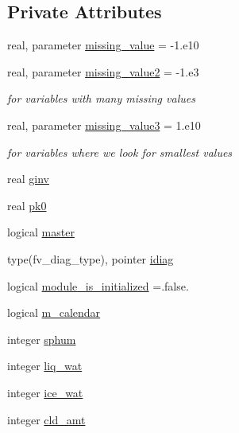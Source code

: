 \subsection*{Private Attributes}
\begin{DoxyCompactItemize}
\item 
real, parameter \hyperlink{classfv__diagnostics__mod_a85945ffd2684b529ef36fb377f2780df}{missing\-\_\-value} = -\/1.e10
\item 
real, parameter \hyperlink{classfv__diagnostics__mod_a0c2b1829b03a7fb093b3d4166de5394a}{missing\-\_\-value2} = -\/1.e3
\begin{DoxyCompactList}\small\item\em for variables with many missing values \end{DoxyCompactList}\item 
real, parameter \hyperlink{classfv__diagnostics__mod_a8751fd73bba3e1f6cd852633004b7753}{missing\-\_\-value3} = 1.e10
\begin{DoxyCompactList}\small\item\em for variables where we look for smallest values \end{DoxyCompactList}\item 
real \hyperlink{classfv__diagnostics__mod_af69e1742e47bc565a4a6e3a436ccb3ea}{ginv}
\item 
real \hyperlink{classfv__diagnostics__mod_a8c1566f74237104b24c6a20268168281}{pk0}
\item 
logical \hyperlink{classfv__diagnostics__mod_a279b4f0374bf7714fae5b351ce11f023}{master}
\item 
type(fv\-\_\-diag\-\_\-type), pointer \hyperlink{classfv__diagnostics__mod_ac17b875d8dec772373a51852c40f0a8a}{idiag}
\item 
logical \hyperlink{classfv__diagnostics__mod_a3f48dc8f540ea0ac0363168cffaf752c}{module\-\_\-is\-\_\-initialized} =.false.
\item 
logical \hyperlink{classfv__diagnostics__mod_a960ab9b28f836a3d409385b29ca55c01}{m\-\_\-calendar}
\item 
integer \hyperlink{classfv__diagnostics__mod_a60dad9285aa4277546ef49434b1d9362}{sphum}
\item 
integer \hyperlink{classfv__diagnostics__mod_a338a3f41be9414e9ec7ab618e5c451f7}{liq\-\_\-wat}
\item 
integer \hyperlink{classfv__diagnostics__mod_af189fa9869405f3888a1f2134dd03f3f}{ice\-\_\-wat}
\item 
integer \hyperlink{classfv__diagnostics__mod_a1e2dc795feb615f8ea7829bdb04319ea}{cld\-\_\-amt}

\end{DoxyCompactItemize}

